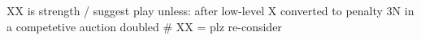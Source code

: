 XX is strength / suggest play unless:
after low-level X converted to penalty
3N in a competetive auction doubled  # XX = plz re-consider
